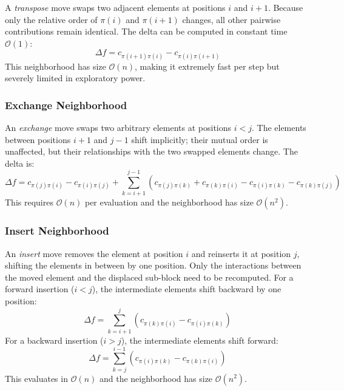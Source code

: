 \documentclass[11pt, a4paper]{article}
\begin{document}
A \textit{transpose} move swaps two adjacent elements at positions $i$ and $i+1$. Because only the relative order of $\pi(i)$ and $\pi(i+1)$ changes, all other pairwise contributions remain identical. The delta can be computed in constant time $\mathcal{O}(1)$:
\begin{equation}
    \Delta f = c_{\pi(i+1)\pi(i)} - c_{\pi(i)\pi(i+1)}
\end{equation}
This neighborhood has size $\mathcal{O}(n)$, making it extremely fast per step but severely limited in exploratory power.

\subsubsection{Exchange Neighborhood}

An \textit{exchange} move swaps two arbitrary elements at positions $i < j$. The elements between positions $i+1$ and $j-1$ shift implicitly; their mutual order is unaffected, but their relationships with the two swapped elements change. The delta is:
\begin{equation}
    \Delta f = c_{\pi(j)\pi(i)} - c_{\pi(i)\pi(j)} + \sum_{k=i+1}^{j-1} \left( c_{\pi(j)\pi(k)} + c_{\pi(k)\pi(i)} - c_{\pi(i)\pi(k)} - c_{\pi(k)\pi(j)} \right)
\end{equation}
This requires $\mathcal{O}(n)$ per evaluation and the neighborhood has size $\mathcal{O}(n^2)$.

\subsubsection{Insert Neighborhood}

An \textit{insert} move removes the element at position $i$ and reinserts it at position $j$, shifting the elements in between by one position. Only the interactions between the moved element and the displaced sub-block need to be recomputed. For a forward insertion ($i < j$), the intermediate elements shift backward by one position:
\begin{equation}
    \Delta f = \sum_{k=i+1}^{j} \left( c_{\pi(k)\pi(i)} - c_{\pi(i)\pi(k)} \right)
\end{equation}
For a backward insertion ($i > j$), the intermediate elements shift forward:
\begin{equation}
    \Delta f = \sum_{k=j}^{i-1} \left( c_{\pi(i)\pi(k)} - c_{\pi(k)\pi(i)} \right)
\end{equation}
This evaluates in $\mathcal{O}(n)$ and the neighborhood has size $\mathcal{O}(n^2)$.
\end{document}
